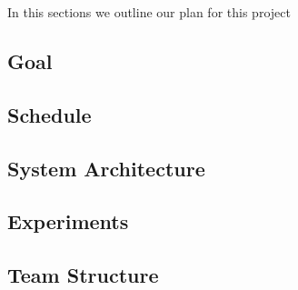 \documentclass[../main.tex]{subfiles}
\begin{document}
In this sections we outline our plan for this project 

\subsection{Goal}

\subsection{Schedule}

\subsection{System Architecture}

\subsection{Experiments}

\subsection{Team Structure}
\end{document}
